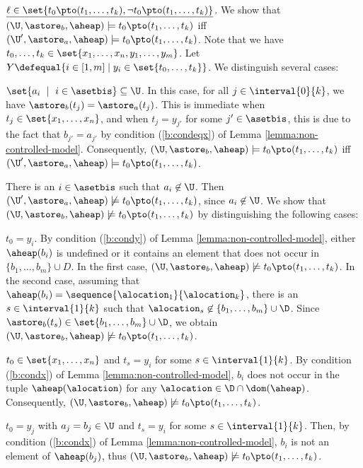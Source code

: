\noindent
$\underline{\ell \in \set{t_0 \pto (t_1, \ldots, t_k), \neg t_0 \pto
    (t_1, \ldots, t_k)}}$. We show that $(\U,\astore_b,\aheap) \models
t_0 \pto (t_1, \ldots, t_k)$ iff $(\U',\astore_a,\aheap) \models t_0
\pto (t_1, \ldots, t_k)$. Note that we have $t_0,\ldots,t_k \in
\set{x_1,\ldots,x_n,y_1,\ldots,y_m}$. Let $Y \defequal \{i \in [1,m]
\mid y_i \in \set{t_0,\ldots,t_k}\}$. We distinguish several
cases:  \begin{compactenum}
\item $\set{a_i \ \mid \ i \in \asetbis} \subseteq \U$. In this case,
  for all $j \in \interval{0}{k}$, we have $\astore_b(t_j) =
  \astore_a(t_j)$. This is immediate when $t_j \in
  \set{x_1,\ldots,x_n}$, and when $t_j = y_{j'}$ for some $j' \in
  \asetbis$, this is due to the fact that $b_{j'} = a_{j'}$ by
  condition (\ref{b:condeqx}) of Lemma
  \ref{lemma:non-controlled-model}. Consequently,
  $(\U,\astore_b,\aheap) \models t_0 \pto (t_1, \ldots, t_k)$ iff
  $(\U',\astore_a, \aheap) \models t_0 \pto (t_1, \ldots, t_k)$.
%
\item There is an $i \in \asetbis$ such that $a_i \not \in \U$. Then
  $(\U',\astore_a,\aheap) \not\models t_0 \pto (t_1, \ldots, t_k)$,
  since $a_i \not \in \U$. We show that $(\U,\astore_b,\aheap) \not
  \models t_0 \pto (t_1, \ldots, t_k)$ by distinguishing the following
  cases:

  \begin{compactenum}
  \item $t_0 = y_i$. By condition (\ref{b:condy}) of Lemma
    \ref{lemma:non-controlled-model}, either $\aheap(b_i)$ is
    undefined or it contains an element that does not occur in $\{
    b_1,\dots,b_m \} \cup D$. In the first case,
    $(\U,\astore_b,\aheap) \not \models t_0 \pto (t_1, \ldots, t_k)$.
    In the second case, assuming that $\aheap(b_i) =
    \sequence{\alocation_1}{\alocation_k}$, there is an $s \in
    \interval{1}{k}$ such that $\alocation_s \not \in \{ b_1,\dots,b_m
    \} \\ \cup \D$.  Since $\astore_b(t_s) \in \set{b_1,\ldots, b_m}
    \cup \D$, we obtain $(\U,\astore_b,\aheap) \not \models t_0 \pto
    (t_1, \ldots, t_k)$.
  \item $t_0 \in \set{x_1,\ldots,x_n}$ and $t_s = y_i$ for some $s \in
    \interval{1}{k}$. By condition (\ref{b:condx}) of Lemma
    \ref{lemma:non-controlled-model}, $b_i$ does not occur in the
    tuple $\aheap(\alocation)$ for any $\alocation \in \D \cap
    \dom(\aheap)$. Consequently, $(\U,\astore_b,\aheap) \not \models
    t_0 \pto (t_1, \ldots, t_k)$.
  \item $t_0 = y_j$ with $a_j = b_j \in \U$ and $t_s = y_i$ for some
    $s \in \interval{1}{k}$. Then, by condition (\ref{b:condx}) of
    Lemma \ref{lemma:non-controlled-model}, $b_i$ is not an element of
    $\aheap(b_j)$, thus $(\U,\astore_b,\aheap) \not \models t_0 \pto
    (t_1, \ldots, t_k)$.
  \end{compactenum}
\end{compactenum}

